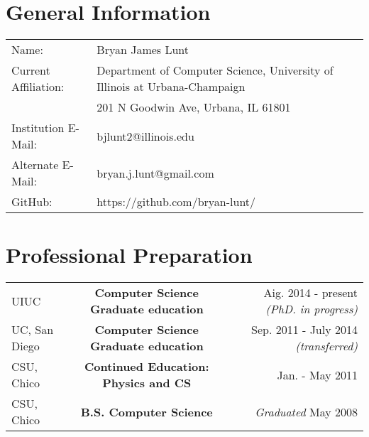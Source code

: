 

%

\section*{General Information}
\begin{tabular}{l l}
Name: & Bryan James Lunt \\
Current Affiliation: & Department of Computer Science, University of Illinois at Urbana-Champaign \\
 &	201 N Goodwin Ave, Urbana, IL 61801 \\
Institution E-Mail: & bjlunt2@illinois.edu \\
Alternate E-Mail: & bryan.j.lunt@gmail.com \\
GitHub: & https://github.com/bryan-lunt/ \\

\end{tabular}


\nocite{Morcos2011a,Procaccini2011a,Lunt2010a}
\nocite{LUNT201017,Lunt393835}
\section*{Professional Preparation}
\begin{tabular}{l c r}

UIUC & {\bf Computer Science Graduate education} & Aig. 2014 - present {\it (PhD. in progress)}\\
UC, San Diego & {\bf Computer Science Graduate education} & Sep. 2011 - July 2014 {\it (transferred)}\\
CSU, Chico & {\bf Continued Education: Physics and CS} & Jan. - May 2011\\
CSU, Chico & {\bf B.S. Computer Science}  & {\it Graduated} May 2008\\
\end{tabular}

